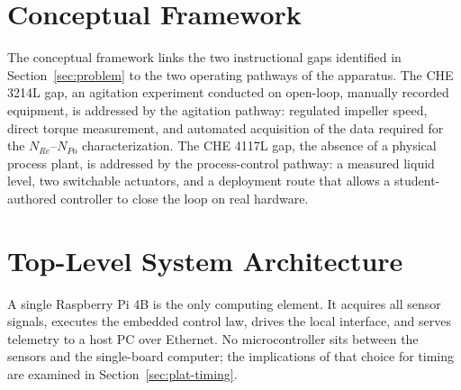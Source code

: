 \section{Conceptual Framework}
\label{sec:arch-framework}


The conceptual framework links the two instructional gaps identified in Section~\ref{sec:problem} to the two operating pathways of the apparatus. The CHE 3214L gap, an agitation experiment conducted on open-loop, manually recorded equipment, is addressed by the agitation pathway: regulated impeller speed, direct torque measurement, and automated acquisition of the data required for the $N_{Re}$--$N_{Po}$ characterization. The CHE 4117L gap, the absence of a physical process plant, is addressed by the process-control pathway: a measured liquid level, two switchable actuators, and a deployment route that allows a student-authored controller to close the loop on real hardware.


\section{Top-Level System Architecture}
\label{sec:arch-top}



A single Raspberry Pi 4B is the only computing element. It acquires all sensor signals, executes the embedded control law, drives the local interface, and serves telemetry to a host PC over Ethernet. No microcontroller sits between the sensors and the single-board computer; the implications of that choice for timing are examined in Section~\ref{sec:plat-timing}.

